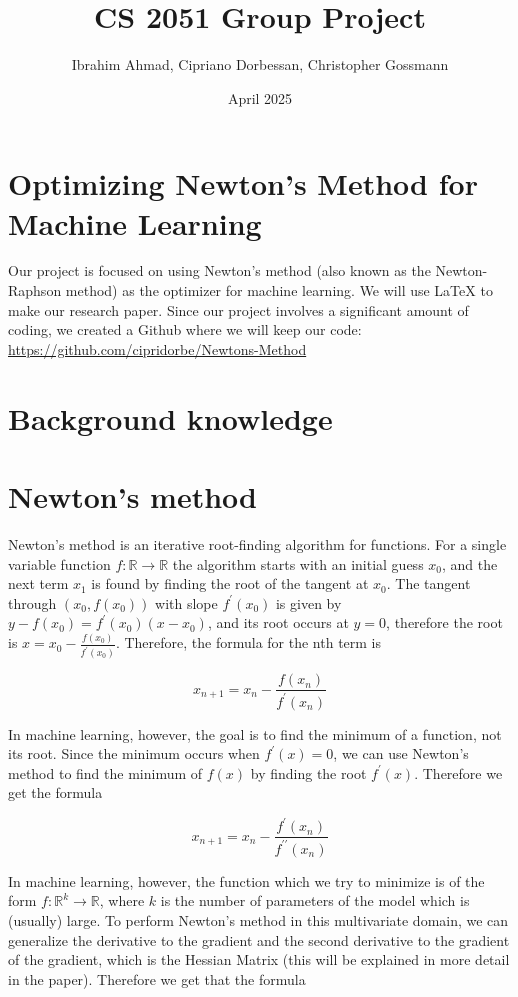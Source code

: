 \documentclass{article}
\title{CS 2051 Group Project}
\author{Ibrahim Ahmad, Cipriano Dorbessan, Christopher Gossmann}
\date{April 2025}
\begin{document}
\section*{Optimizing Newton's Method for Machine Learning}
Our project is focused on using Newton's method (also known as the Newton-Raphson method) as the optimizer for machine learning. We will use LaTeX to make our research paper. Since our project involves a significant amount of coding, we created a Github where we will keep our code: \href{https://github.com/cipridorbe/Newtons-Method}{https://github.com/cipridorbe/Newtons-Method}

\section*{Background knowledge}
\section*{Newton's method}
Newton's method is an iterative root-finding algorithm for functions. For a single variable function $f: \mathbb{R} \rightarrow \mathbb{R}$ the algorithm starts with an initial guess $x_{0}$, and the next term $x_{1}$ is found by finding the root of the tangent at $x_{0}$. The tangent through $\left(x_{0}, f\left(x_{0}\right)\right)$ with slope $f^{\prime}\left(x_{0}\right)$ is given by $y-f\left(x_{0}\right)=f^{\prime}\left(x_{0}\right)\left(x-x_{0}\right)$, and its root occurs at $y=0$, therefore the root is $x=x_{0}-\frac{f\left(x_{0}\right)}{f^{\prime}\left(x_{0}\right)}$. Therefore, the formula for the nth term is

$$
x_{n+1}=x_{n}-\frac{f\left(x_{n}\right)}{f^{\prime}\left(x_{n}\right)}
$$

In machine learning, however, the goal is to find the minimum of a function, not its root. Since the minimum occurs when $f^{\prime}(x)=0$, we can use Newton's method to find the minimum of $f(x)$ by finding the root $f^{\prime}(x)$. Therefore we get the formula

$$
x_{n+1}=x_{n}-\frac{f^{\prime}\left(x_{n}\right)}{f^{\prime \prime}\left(x_{n}\right)}
$$

In machine learning, however, the function which we try to minimize is of the form $f: \mathbb{R}^{k} \rightarrow \mathbb{R}$, where $k$ is the number of parameters of the model which is (usually) large. To perform Newton's method in this multivariate domain, we can generalize the derivative to the gradient and the second derivative to the gradient of the gradient, which is the Hessian Matrix (this will be explained in more detail in the paper). Therefore we get that the formula
\end{document}
